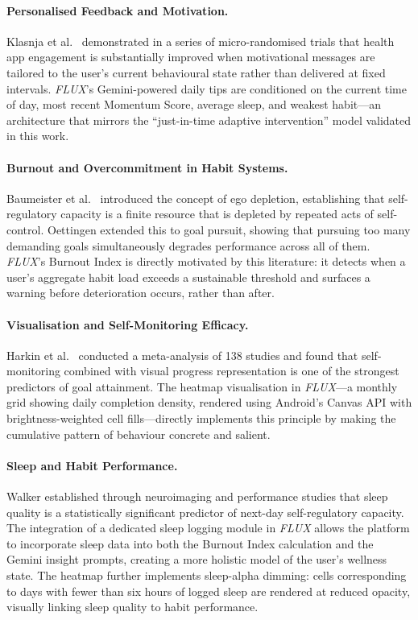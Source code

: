 \documentclass[12pt,a4paper]{article}
\newcommand{\FL}{\textit{FLUX}}
\begin{document}
\paragraph{Personalised Feedback and Motivation.}
Klasnja et al.\ \cite{klasnja2019} demonstrated in a series of micro-randomised
trials that health app engagement is substantially improved when motivational messages
are tailored to the user's current behavioural state rather than delivered at fixed
intervals. \FL{}'s Gemini-powered daily tips are conditioned on the current time
of day, most recent Momentum Score, average sleep, and weakest habit---an architecture
that mirrors the ``just-in-time adaptive intervention'' model validated in this work.

\paragraph{Burnout and Overcommitment in Habit Systems.}
Baumeister et al.\ \cite{baumeister1998} introduced the concept of ego depletion,
establishing that self-regulatory capacity is a finite resource that is depleted
by repeated acts of self-control. Oettingen \cite{oettingen2014} extended this to
goal pursuit, showing that pursuing too many demanding goals simultaneously degrades
performance across all of them. \FL{}'s Burnout Index is directly motivated by
this literature: it detects when a user's aggregate habit load exceeds a sustainable
threshold and surfaces a warning before deterioration occurs, rather than after.

\paragraph{Visualisation and Self-Monitoring Efficacy.}
Harkin et al.\ \cite{harkin2016} conducted a meta-analysis of 138 studies and found
that self-monitoring combined with visual progress representation is one of the
strongest predictors of goal attainment. The heatmap visualisation in \FL{}---a
monthly grid showing daily completion density, rendered using Android's Canvas API
with brightness-weighted cell fills---directly implements this principle by making
the cumulative pattern of behaviour concrete and salient.

\paragraph{Sleep and Habit Performance.}
Walker \cite{walker2017} established through neuroimaging and performance studies
that sleep quality is a statistically significant predictor of next-day
self-regulatory capacity. The integration of a dedicated sleep logging module in
\FL{} allows the platform to incorporate sleep data into both the Burnout Index
calculation and the Gemini insight prompts, creating a more holistic model of the
user's wellness state. The heatmap further implements sleep-alpha dimming: cells
corresponding to days with fewer than six hours of logged sleep are rendered at
reduced opacity, visually linking sleep quality to habit performance.
\end{document}
